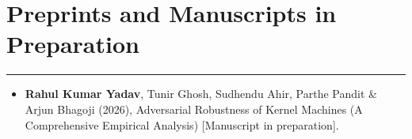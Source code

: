 \documentclass{article}
\begin{document}


\section*{Preprints and Manuscripts in Preparation}
\hrule
\vspace{1em}

\begin{itemize}[leftmargin=*]

    \item[] \noindent
    \textbf{Rahul Kumar Yadav}, Tunir Ghosh, Sudhendu Ahir, Parthe Pandit \& Arjun Bhagoji (2026), Adversarial Robustness of Kernel Machines (A Comprehensive Empirical Analysis) [Manuscript in preparation].
\end{itemize}
\end{document}
